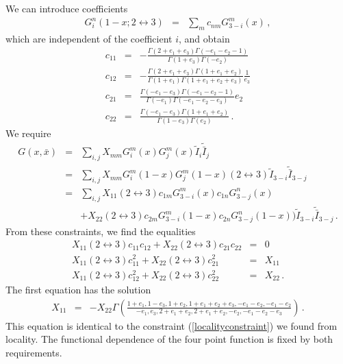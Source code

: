 \documentclass[12pt]{article}
\numberwithin{equation}{section}
\numberwithin{equation}{section}
\numberwithin{table}{section}\setlength{\multlinegap}{25pt}
\begin{document}
We can introduce coefficients
\begin{eqnarray}
G_{i}^n (1-x;2 \leftrightarrow 3) &=& \sum_m c_{nm} G^m_{3-i} (x) \, ,
\end{eqnarray}
which are independent of the coefficient $i$, 
and obtain
\begin{eqnarray}
c_{11} &=& -\frac{\Gamma(2+e_1+e_3) \Gamma( -e_1-e_2-1)}{\Gamma(1+e_3) \Gamma(-e_2)}
\nonumber \\
c_{12} &=& -\frac{\Gamma(2+{e_1+e_3} ) \Gamma(1+ e_1+e_2 )}{\Gamma(1+{e_1} ) \Gamma(1+e_1+e_2+e_3 )}  \frac{1}{e_3}
\nonumber \\
c_{21} &=&   \frac{\Gamma(-e_1-e_3 ) \Gamma(-e_1-e_2-1 )}{\Gamma({-e_1} ) \Gamma(-e_1-e_2-e_3 )} 
e_2 
\nonumber \\
c_{22} &=& \frac{\Gamma(-e_1-e_3 ) \Gamma(1+ {e_1+e_2} )}{\Gamma(1-{e_3} ) \Gamma({e_2} )} \, .
\end{eqnarray}
 We require
\begin{eqnarray}
G(x,\bar{x}) &=& \sum_{i,j} X_{mm} G^m_{i}(x)  G^m_{j}(x) \tilde{I}_i \tilde{\bar{I}}_j
\nonumber \\
&=&  \sum_{i,j} X_{mm} G^m_{i}(1-x) G^m_j (1-x) (2 \leftrightarrow 3) \tilde{I}_{3-i} \tilde{\bar{I}}_{3-j}
\nonumber \\
&=& \sum_{i,j} X_{11}  (2 \leftrightarrow 3) c_{1m} G^m_{3-i}(x) c_{1n} G^n_{3-j}(x) 
 \\
 & & + X_{22}  (2 \leftrightarrow 3) c_{2m} G^m_{3-i} (1-x) c_{2n} G^n_{3-j}(1-x)) \tilde{I}_{3-i} \tilde{\bar{I}}_{3-j} \, .\nonumber
\end{eqnarray}
From these constraints, we find the equalities
\begin{eqnarray}
X_{11} (2 \leftrightarrow 3) c_{11} c_{12} + X_{22} (2 \leftrightarrow 3) c_{21} c_{22} &=& 0
\nonumber \\
X_{11} (2 \leftrightarrow 3) c_{11}^2 + X_{22} (2 \leftrightarrow 3) c_{21}^2 &=& X_{11}
\nonumber \\
X_{11} (2 \leftrightarrow 3) c_{12}^2 + X_{22} (2 \leftrightarrow 3) c_{22}^2 &=& X_{22} \, .
\end{eqnarray}
The first equation has the solution
\begin{eqnarray}
X_{11} &=&  - X_{22}
\Gamma(\frac{1+e_1,1-e_3,1+e_2,1+e_1+e_2+e_3,-e_1-e_2,-e_1-e_2}{
-e_1,e_3,2+e_1+e_2,2+e_1+e_2,-e_2,-e_1-e_2-e_3}) \, . \nonumber
\end{eqnarray}
This equation is identical to the constraint (\ref{localityconstraint}) we found from locality.
The functional dependence of the four point function is fixed by both requirements.
\end{document}
